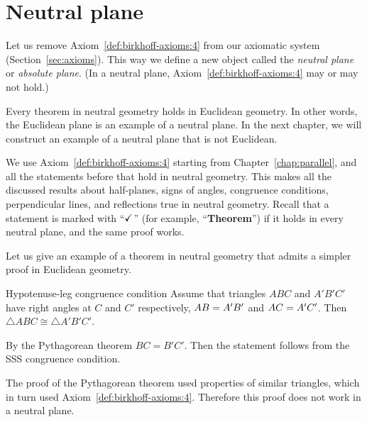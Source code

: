 
\chapter{Neutral plane}\label{chap:non-euclid}

Let us remove Axiom~\ref{def:birkhoff-axioms:4} from our axiomatic system (Section~\ref{sec:axioms}).
This way we define a new object called the 
\emph{neutral plane} or \emph{absolute plane}.
(In a neutral plane, Axiom~\ref{def:birkhoff-axioms:4} may or may not hold.)

Every theorem in neutral geometry holds in Euclidean geometry.
In other words, the Euclidean plane is an example of a neutral plane. 
In the next chapter, we will construct an example of a neutral plane that is not Euclidean.

We use Axiom~\ref{def:birkhoff-axioms:4} starting from Chapter~\ref{chap:parallel},
and all the statements before that hold in neutral geometry.
This makes all the discussed results
about
half-planes,
signs of angles,
congruence conditions,
perpendicular lines,
and reflections 
true in neutral geometry.
Recall that a statement is marked with ``$\checkmark$'' (for example, ``\textbf{Theorem\abs}'') if it holds in every neutral plane, and the same proof works.


Let us give an example of a theorem in neutral geometry that admits a simpler proof in Euclidean geometry. 

\begin{thm}{Hypotenuse-leg congruence condition}\label{thm:hypotenuse-leg}
Assume that triangles $ABC$ and $A'B'C'$
have right angles at $C$ and $C'$ respectively, 
$AB\z=A'B'$ and $AC\z=A'C'$.
Then $\triangle ABC\cong\triangle A'B'C'$.
\end{thm}


By the Pythagorean theorem $BC=B'C'$.
Then the statement follows from the SSS congruence condition.
\qeds

The proof of the Pythagorean theorem used properties of similar triangles, which in turn used Axiom~\ref{def:birkhoff-axioms:4}. 
Therefore this proof does not work in a neutral plane.

